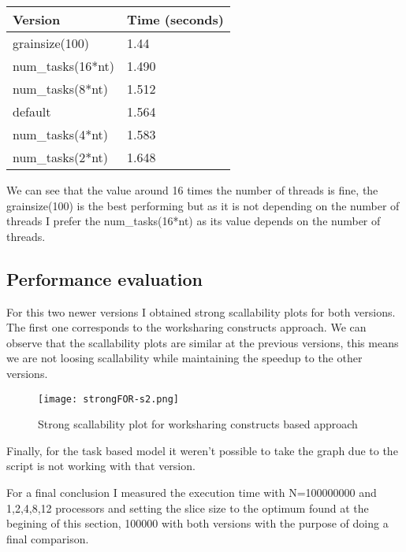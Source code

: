 \begin{table}[h!]
\begin{tabular}{|l|l|}
\hline
Version           & Time (seconds) \\ \hline
grainsize(100)    & 1.44           \\ \hline
num\_tasks(16*nt) & 1.490          \\ \hline
num\_tasks(8*nt)  & 1.512          \\ \hline
default           & 1.564          \\ \hline
num\_tasks(4*nt)  & 1.583          \\ \hline
num\_tasks(2*nt)  & 1.648          \\ \hline
\end{tabular}
\end{table}
\justify
We can see that the value around 16 times the number of threads is fine, the grainsize(100) is the best performing but as it is not depending on the number of threads I prefer the num\_tasks(16*nt) as its value depends on the number of threads.

\subsection{Performance evaluation}
\justify
For this two newer versions I obtained strong scallability plots for both versions.
\justify
The first one corresponds to the worksharing constructs approach. We can observe that the scallability plots are similar at the previous versions, this means we are not loosing scallability while maintaining the speedup to the other versions.
\clearpage
\begin{figure}[!h]
    \centering
    \texttt{[image: strongFOR-s2.png]}
    \caption{Strong scallability plot for worksharing constructs based approach}
\end{figure}

\justify
Finally, for the task based model it weren't possible to take the graph due to the script is not working with that version. 

\justify
For a final conclusion I measured the execution time with N=100000000 and 1,2,4,8,12 processors and setting the slice size to the optimum found at the begining of this section, 100000 with both versions with the purpose of doing a final comparison.

